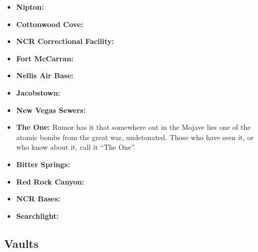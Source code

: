 \documentclass[11pt]{article} %
\begin{document}
\begin{itemize}
	\item \textbf{Nipton:}
	
	\item \textbf{Cottonwood Cove:}
	
	\item \textbf{NCR Correctional Facility:}
	
	\item \textbf{Fort McCarran:}
	
	\item \textbf{Nellis Air Base:}
	
	\item \textbf{Jacobstown:}
	
	\item \textbf{New Vegas Sewers:}
	
	\item \textbf{The One:} Rumor has it that somewhere out in the Mojave lies one of the atomic bombs from the great war, undetonated. Those who have seen it, or who know about it, call it ``The One''.
	
	\item \textbf{Bitter Springs:}
	
	\item \textbf{Red Rock Canyon:}
	
	\item \textbf{NCR Bases:}
	
	\item \textbf{Searchlight:}
\end{itemize}

\subsection{Vaults}
\end{document}
